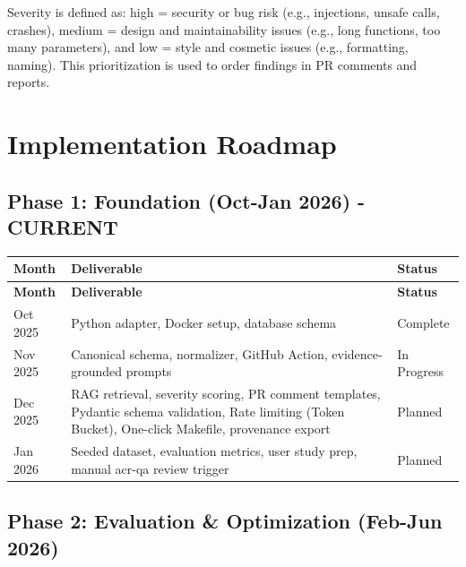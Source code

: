 \documentclass[11pt,a4paper]{article}
\begin{document}
Severity is defined as: high = security or bug risk (e.g., injections, unsafe calls, crashes), medium = design and maintainability issues (e.g., long functions, too many parameters), and low = style and cosmetic issues (e.g., formatting, naming). This prioritization is used to order findings in PR comments and reports.

\section{Implementation Roadmap}

\subsection{Phase 1: Foundation (Oct-Jan 2026) - CURRENT}

\begin{longtable}{p{3cm}p{8cm}p{3cm}}
\toprule
\textbf{Month} & \textbf{Deliverable} & \textbf{Status} \\
\midrule
\endfirsthead
\toprule
\textbf{Month} & \textbf{Deliverable} & \textbf{Status} \\
\midrule
\endhead
Oct 2025 & Python adapter, Docker setup, database schema & Complete \\
\midrule
Nov 2025 & Canonical schema, normalizer, GitHub Action, evidence-grounded prompts & In Progress \\
\midrule
Dec 2025 & RAG retrieval, severity scoring, PR comment templates, Pydantic schema validation, Rate limiting (Token Bucket), One-click Makefile, provenance export & Planned \\
\midrule
Jan 2026 & Seeded dataset, evaluation metrics, user study prep, manual acr-qa review trigger & Planned \\
\bottomrule
\end{longtable}

\subsection{Phase 2: Evaluation \& Optimization (Feb-Jun 2026)}
\end{document}

